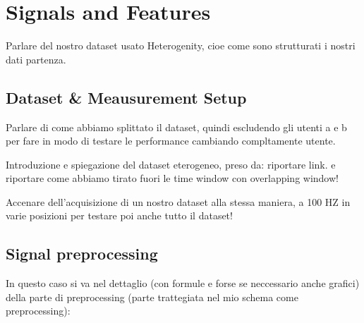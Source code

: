 \section{Signals and Features}
\label{sec:model}

Parlare del nostro dataset usato Heterogenity, cioe come sono strutturati i nostri dati partenza. 



\subsection{Dataset \& Meausurement Setup}
\label{subsec:dataset-measurement-setup}
Parlare di come abbiamo splittato il dataset, quindi escludendo gli utenti a e b per fare in modo di testare le performance cambiando compltamente utente.

Introduzione e spiegazione del dataset eterogeneo, preso da: riportare link. e riportare come abbiamo tirato fuori le time window con overlapping window!

Accenare dell'acquisizione di un nostro dataset alla stessa maniera, a 100 HZ in varie posizioni per testare poi anche tutto il dataset!

\subsection{Signal preprocessing}

In questo caso si va nel dettaglio (con formule e forse se neccessario anche grafici) della parte di preprocessing (parte trattegiata nel mio schema come preprocessing):

\newcommand*{\x}{\boldsymbol{x}}
\newcommand*{\y}{\boldsymbol{y}}
\newcommand*{\z}{\boldsymbol{z}}
\newcommand*{\xm}{\bar{\x}}

